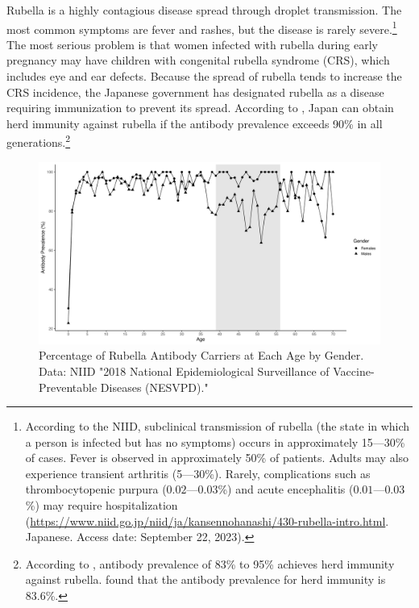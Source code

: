 \documentclass[
]{article}
\begin{document}
Rubella is a highly contagious disease spread through droplet transmission. The most common symptoms are fever and rashes, but the disease is rarely severe.\footnote{According to the NIID, subclinical transmission of rubella (the state in which a person is infected but has no symptoms) occurs in approximately 15---30\% of cases. Fever is observed in approximately 50\% of patients. Adults may also experience transient arthritis (5---30\%). Rarely, complications such as thrombocytopenic purpura (\(0.02\)---\(0.03\)\%) and acute encephalitis (\(0.01\)---\(0.03\)\%) may require hospitalization (\url{https://www.niid.go.jp/niid/ja/kansennohanashi/430-rubella-intro.html}. Japanese. Access date: September 22, 2023).} The most serious problem is that women infected with rubella during early pregnancy may have children with congenital rubella syndrome (CRS), which includes eye and ear defects. Because the spread of rubella tends to increase the CRS incidence, the Japanese government has designated rubella as a disease requiring immunization to prevent its spread. According to \citet{Kinoshita2016}, Japan can obtain herd immunity against rubella if the antibody prevalence exceeds 90\% in all generations.\footnote{According to \citet{Plans-Rubio2012}, antibody prevalence of 83\% to 95\% achieves herd immunity against rubella. \citet{Nishiura2015} found that the antibody prevalence for herd immunity is 83.6\%.}

\begin{figure}[t]
\includegraphics{discussion-paper_files/figure-latex/antibody-1} \caption{Percentage of Rubella Antibody Carriers at Each Age by Gender. Data: NIID "2018 National Epidemiological Surveillance of Vaccine-Preventable Diseases (NESVPD)."}\label{fig:antibody}
\end{figure}
\end{document}
